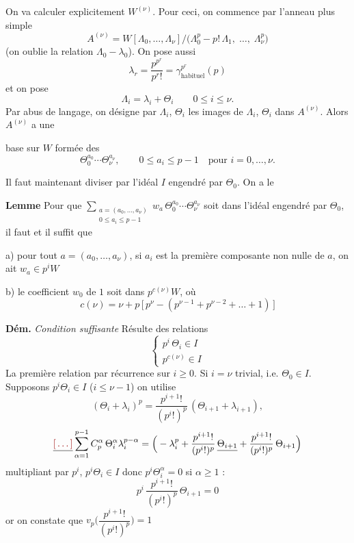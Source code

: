\documentclass[11pt,a4paper]{article}
\begin{document}
On va calculer explicitement $W^{(\nu)}$. Pour ceci, \struck{\ill{}} on commence
par l'anneau plus simple
\[
A^{(\nu)} = W[\Lambda_0, \dots, \Lambda_\nu] \big/ \big(\Lambda_0^{p} - p!\,\Lambda_1,\; \dots,\; \Lambda_\nu^{p}\big)
\]
(on oublie la relation $\Lambda_0 - \lambda_0$). On pose aussi
\[
\lambda_r = \frac{p^{p^{r}}}{p^{r}!} = \gamma^{p^{r}}_{\text{habituel}}(p)
\]
et on pose
\[
\Lambda_i = \lambda_i + \Theta_i \qquad 0 \leq i \leq \nu .
\]
Par abus de langage, on désigne \ill{} par $\Lambda_i$, $\Theta_i$ les images de
$\Lambda_i$, $\Theta_i$ dans $A^{(\nu)}$. Alors $A^{(\nu)}$ a une


base sur $W$ formée des
\[
\Theta_0^{a_0} \cdots \Theta_\nu^{a_\nu}, \qquad 0 \leq a_i \leq p-1 \quad \text{pour } i = 0, \dots, \nu .
\]

Il faut maintenant diviser par l'idéal $I$ engendré par $\Theta_0$. On a le

\textbf{Lemme} \quad Pour que
$\displaystyle\sum_{\substack{a = (a_0, \dots, a_\nu) \\ 0 \leq a_i \leq p-1}} w_a\, \Theta_0^{a_0} \cdots \Theta_\nu^{a_\nu}$
soit dans l'idéal engendré par $\Theta_0$, il faut et il suffit que

a) pour tout $a = (a_0, \dots, a_\nu)$, si  $a_i$ est la première composante non nulle de $a$, on
ait \struck{\ill{}} $w_a \in p^{i} W$

b) le coefficient $w_0$ de $1$ soit dans $p^{c(\nu)} W$, où
\[
c(\nu) = \nu + p\,\big[\,p^{\nu} - (p^{\nu-1} + p^{\nu-2} + \dots + 1)\,\big]
\]

\textbf{Dém.} \quad \emph{Condition suffisante} \quad Résulte des relations
\[
\begin{cases}
p^{i}\,\Theta_i \in I \\
p^{c(\nu)} \in I
\end{cases}
\]
La première relation par récurrence sur $i \geq 0$. Si $i = \nu$ \ill{} trivial, i.e. $\Theta_0 \in I$. Supposons \ill{}
$p^{i}\Theta_i \in I$ ($i \leq \nu - 1$) on utilise
\[
(\Theta_i + \lambda_i)^{p} = \frac{p^{i+1}!}{(p^{i}!)^{p}}\,(\Theta_{i+1} + \lambda_{i+1}) ,
\]
\ill{}
\[
\struck{\ill{}} \sum_{\alpha=1}^{p-1} C_p^{\alpha}\,\Theta_i^{\alpha}\lambda_i^{p-\alpha}
= \Big( -\lambda_i^{p} + \frac{p^{i+1}!}{(p^{i}!)^{p}}\,\struck{\Theta_{i+1}}
+ \frac{p^{i+1}!}{(p^{i}!)^{p}}\,\Theta_{i+1} \Big)
\]
multipliant par $p^{i}$, \ill{} $p^{i}\Theta_i \in I$ donc $p^{i}\Theta_i^{\alpha} = 0$
si $\alpha \geq 1$ :
\[
p^{i}\,\frac{p^{i+1}!}{(p^{i}!)^{p}}\,\Theta_{i+1} = 0
\]
or on constate que $v_p\Big(\dfrac{p^{i+1}!}{(p^{i}!)^{p}}\Big) = 1$
\end{document}
